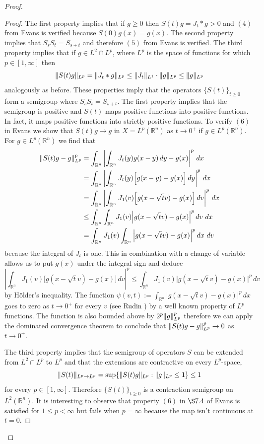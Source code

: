 \documentclass{article}
\DeclarePairedDelimiter{\norm}{\lVert}{\rVert}
\begin{document}
\begin{flushleft}
\begin{proof}
\begin{proof}
The first property implies that if $g\ge 0$ then $S(t)g = J_t * g > 0$ and $(4)$ from Evans is verified because $S(0)g(x)=g(x)$. The second property implies that $S_s S_t= S_{s+t}$ and therefore $(5)$ from Evans is verified. The third property implies that if $g\in L^2 \cap L^p$, where $L^p$ is the space of functions for which $p\in[1,\infty]$ then
$$\norm{S(t) g}_{L^p} = \norm{J_t * g}_{L^p}\le \norm{J_t}_{L^1}\cdot \norm{g}_{L^p}\le\norm{g}_{L^p}$$
analogously as before. These properties imply that the operators $\{S(t)\}_{t\ge 0}$ form a semigroup where $S_sS_t=S_{s+t}$. The first property implies that the semigroup is positive and $S(t)$ maps positive functions into positive functions. In fact, it maps positive functions into strictly positive functions. To verify $(6)$ in Evans we show that $S(t)g \to g$ in $X=L^p(\mathbb R^n)$ as $t\to 0^+$ if $g\in L^p(\mathbb R^n)$. For $g\in L^p(\mathbb R^n)$ we find that
\begin{align*}
\norm{S(t)g -g}_{L^p}^p &=
\int_{\mathbb R^n} \left | \int_{\mathbb R^n}J_t(y)g(x-y)\,dy -g(x)\right| ^p\,dx \\&=
\int_{\mathbb R^n} \left |\int_{\mathbb R^n}J_t(y)\Big[g(x-y)-g(x)\Big]\,dy\right |^p\,dx \\&=
\int_{\mathbb R^n}\left |\int_{\mathbb R^n} J_1(v) \Big[g(x-\sqrt{t}v)-g(x)\Big]\,dv\right |^p\,dx \\&\le
\int_{\mathbb R^n}\int_{\mathbb R^n}J_1(v)\Big|g(x-\sqrt{t}v)-g(x)\Big|^p\,dv~dx\\&=
\int_{\mathbb R^n}J_1(v)\int_{\mathbb R^n} \Big|g(x-\sqrt{t}v)-g(x)\Big|^p\,dx~dv
\end{align*}
because the integral of $J_t$ is one. This in combination with a change of variable allows us to put $g(x)$ under the integral sign and deduce
$$\left |\int_{\mathbb R^n} J_1(v) \Big[g(x-\sqrt{t}v)-g(x)\Big]\,dv\right |^p \le \int_{\mathbb R^n}J_1(v)\Big|g(x-\sqrt{t}v)-g(x)\Big|^p\,dv$$
by Hölder's inequality. The function $\psi(v,t):=\int_{\mathbb R^n}\big|g(x-\sqrt{t}v)-g(x)\big|^p\,dx$ goes to zero as $t\to 0^+$ for every $v$ (see Rudin \cite{10.5555/26851}) by a well known property of $L^p$ functions. The function is also bounded above by $2^p\norm{g}_{L^p}^p$ therefore we can apply the dominated convergence theorem to conclude that $\norm{S(t)g -g}_{L^p}^p\to 0$ as $t\to 0^+$.

The third property implies that the semigroup of operators $S$ can be extended from $L^2\cap L^p$ to $L^p$ and that the extensions are contractive on every $L^p$-space,
$$\norm{S(t)}_{L^p \to L^p}=\sup\{\norm{S(t)g}_{L^p}:\norm{g}_{L^p}\le 1\}\le 1$$
for every $p\in[1,\infty]$. Therefore $\{S(t)\}_{t\ge 0}$ is a contraction semigroup on $L^2(\mathbb R^n).$ It is interesting to observe that property $(6)$ in $\S 7.4$ of Evans is satisfied for $1\le p < \infty$ but fails when $p=\infty$ because the map isn't continuous at $t=0$.


\end{proof}
\end{proof}
\end{flushleft}
\end{document}
